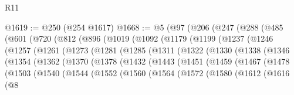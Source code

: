\begin{lexlean}{R11}
\begin{coremodule}
@1619 := @250 (@254 @1617)
@1668 := @5
    (@97
      (@206
        (@247
          (@288
            (@485
              (@601
                (@720
                  (@812
                    (@896
                      (@1019
                        (@1092
                          (@1179
                            (@1199
                              (@1237
                                (@1246
                                  (@1257
                                    (@1261
                                      (@1273
                                        (@1281
                                          (@1285
                                            (@1311
                                              (@1322
                                                (@1330
                                                  (@1338
                                                    (@1346
                                                      (@1354
                                                        (@1362
                                                          (@1370
                                                            (@1378
                                                              (@1432
                                                                (@1443
                                                                  (@1451
                                                                    (@1459
                                                                      (@1467
                                                                        (@1478
                                                                          (@1503
                                                                            (@1540
                                                                              (@1544
                                                                                (@1552
                                                                                  (@1560
                                                                                    (@1564
                                                                                      (@1572
                                                                                        (@1580
                                                                                          (@1612
                                                                                            (@1616
                                                                                              (@8

\end{coremodule}
\end{lexlean}
